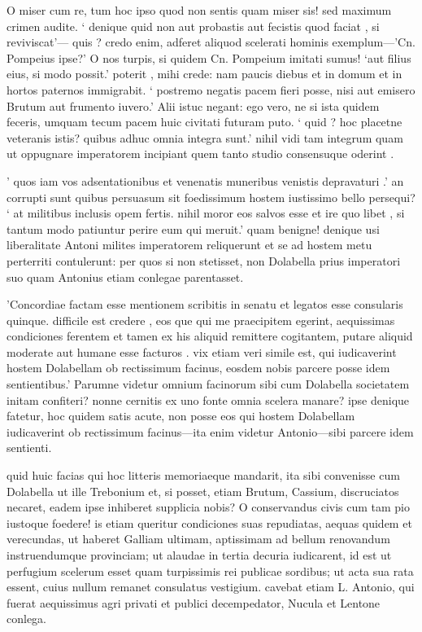  O miser cum re, tum hoc ipso quod non sentis quam miser sis! sed maximum crimen audite. ` denique quid non aut probastis aut fecistis quod faciat , si reviviscat'— quis ? credo enim, adferet aliquod scelerati hominis exemplum—'Cn. Pompeius ipse?' O nos turpis, si quidem Cn. Pompeium imitati sumus! `aut filius eius, si modo possit.' poterit , mihi crede: nam paucis diebus et in domum et in hortos paternos immigrabit. ` postremo negatis pacem fieri posse, nisi aut emisero Brutum aut frumento iuvero.' Alii istuc negant: ego vero, ne si ista quidem feceris, umquam tecum pacem huic civitati futuram puto. ` quid ? hoc placetne veteranis istis? quibus adhuc omnia integra sunt.' nihil vidi tam integrum quam ut oppugnare imperatorem incipiant quem tanto studio consensuque oderint .

 ' quos iam vos adsentationibus et venenatis muneribus venistis depravaturi .' an corrupti sunt quibus persuasum sit foedissimum hostem iustissimo bello persequi? ` at militibus inclusis opem fertis. nihil moror eos salvos esse et ire quo libet , si tantum modo patiuntur perire eum qui meruit.' quam benigne! denique usi liberalitate Antoni milites imperatorem reliquerunt et se ad hostem metu perterriti contulerunt: per quos si non stetisset, non Dolabella prius imperatori suo quam Antonius etiam conlegae parentasset.

 'Concordiae factam esse mentionem scribitis in senatu et legatos esse consularis quinque. difficile est credere , eos que qui me praecipitem egerint, aequissimas condiciones ferentem et tamen ex his aliquid remittere cogitantem, putare aliquid moderate aut humane esse facturos . vix etiam veri simile est, qui iudicaverint hostem Dolabellam ob rectissimum facinus, eosdem nobis parcere posse idem sentientibus.' Parumne videtur omnium facinorum sibi cum Dolabella societatem initam confiteri? nonne cernitis ex uno fonte omnia scelera manare? ipse denique fatetur, hoc quidem satis acute, non posse eos qui hostem Dolabellam iudicaverint ob rectissimum facinus—ita enim videtur Antonio—sibi parcere idem sentienti.

 quid huic facias qui hoc litteris memoriaeque mandarit, ita sibi convenisse cum Dolabella ut ille Trebonium et, si posset, etiam Brutum, Cassium, discruciatos necaret, eadem ipse inhiberet supplicia nobis? O conservandus civis cum tam pio iustoque foedere! is etiam queritur condiciones suas repudiatas, aequas quidem et verecundas, ut haberet Galliam ultimam, aptissimam ad bellum renovandum instruendumque provinciam; ut alaudae in tertia decuria iudicarent, id est ut perfugium scelerum esset quam turpissimis rei publicae sordibus; ut acta sua rata essent, cuius nullum remanet consulatus vestigium. cavebat etiam L. Antonio, qui fuerat aequissimus agri privati et publici decempedator, Nucula et Lentone conlega.

